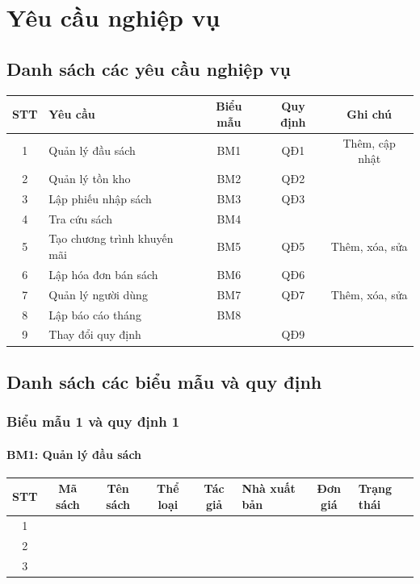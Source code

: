 \documentclass[12pt]{report}
\begin{document}
    \section{Yêu cầu nghiệp vụ}
        \subsection{Danh sách các yêu cầu nghiệp vụ}
            \begin{tabular}{|c|l|c|c|c|}
                \hline
                \textbf{STT} & \textbf{Yêu cầu} & 
                \textbf{Biểu mẫu} & \textbf{Quy định} & 
                \textbf{Ghi chú} \\ \hline
                1 & Quản lý đầu sách & BM1 & QĐ1 & Thêm, cập nhật \\ \hline
                2 & Quản lý tồn kho & BM2 & QĐ2 & \\ \hline
                3 & Lập phiếu nhập sách & BM3 & QĐ3 & \\ \hline
                4 & Tra cứu sách & BM4 & & \\ \hline
                5 & Tạo chương trình khuyến mãi & BM5 & QĐ5 & Thêm, xóa, sửa \\ \hline
                6 & Lập hóa đơn bán sách & BM6 & QĐ6 & \\ \hline 
                7 & Quản lý người dùng & BM7 & QĐ7 & Thêm, xóa, sửa \\ \hline 
                8 & Lập báo cáo tháng & BM8 & & \\ \hline
                9 & Thay đổi quy định & & QĐ9 & \\ \hline
            \end{tabular}
        \subsection{Danh sách các biểu mẫu và quy định}
            \subsubsection{Biểu mẫu 1 và quy định 1}
                \paragraph{BM1: Quản lý đầu sách}
                \begin{tabularx}{\textwidth}{|c|c|c|c|c|>{\RaggedRight}X|c|>{\RaggedRight}X|}
                    \hline
                    \textbf{STT} & \textbf{Mã sách} & \textbf{Tên sách} & 
                    \textbf{Thể loại} & \textbf{Tác giả} & \textbf{Nhà xuất bản} & 
                    \textbf{Đơn giá} & \textbf{Trạng thái} \\ \hline
                    1 & & & & & & & \\ \hline
                    2 & & & & & & & \\ \hline
                    3 & & & & & & & \\ \hline
                \end{tabularx}
\end{document}
